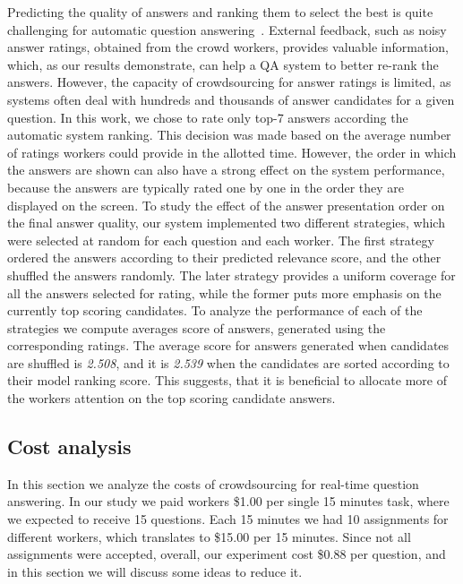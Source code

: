 \documentclass[letterpaper]{article}
\begin{document}
Predicting the quality of answers and ranking them to select the best is quite challenging for automatic question answering~\cite{surdeanu2011learning}.
External feedback, such as noisy answer ratings, obtained from the crowd workers, provides valuable information, which, as our results demonstrate, can help a QA system to better re-rank the answers.
However, the capacity of crowdsourcing for answer ratings is limited, as systems often deal with hundreds and thousands of answer candidates for a given question.
In this work, we chose to rate only top-7 answers according the automatic system ranking.
This decision was made based on the average number of ratings workers could provide in the allotted time.
However, the order in which the answers are shown can also have a strong effect on the system performance, because the answers are typically rated one by one in the order they are displayed on the screen.
To study the effect of the answer presentation order on the final answer quality, our system implemented two different strategies, which were selected at random for each question and each worker.
The first strategy ordered the answers according to their predicted relevance score, and the other shuffled the answers randomly.
The later strategy provides a uniform coverage for all the answers selected for rating, while the former puts more emphasis on the currently top scoring candidates.
To analyze the performance of each of the strategies we compute averages score of answers, generated using the corresponding ratings.
The average score for answers generated when candidates are shuffled is \textit{2.508}, and it is \textit{2.539} when the candidates are sorted according to their model ranking score.
This suggests, that it is beneficial to allocate more of the workers attention on the top scoring candidate answers.

\subsection{Cost analysis}
\label{sec:analysis:cost}

In this section we analyze the costs of crowdsourcing for real-time question answering.
In our study we paid workers \$1.00 per single 15 minutes task, where we expected to receive 15 questions.
Each 15 minutes we had 10 assignments for different workers, which translates to \$15.00 per 15 minutes.
Since not all assignments were accepted, overall, our experiment cost \$0.88 per question, and in this section we will discuss some ideas to reduce it.
\end{document}
